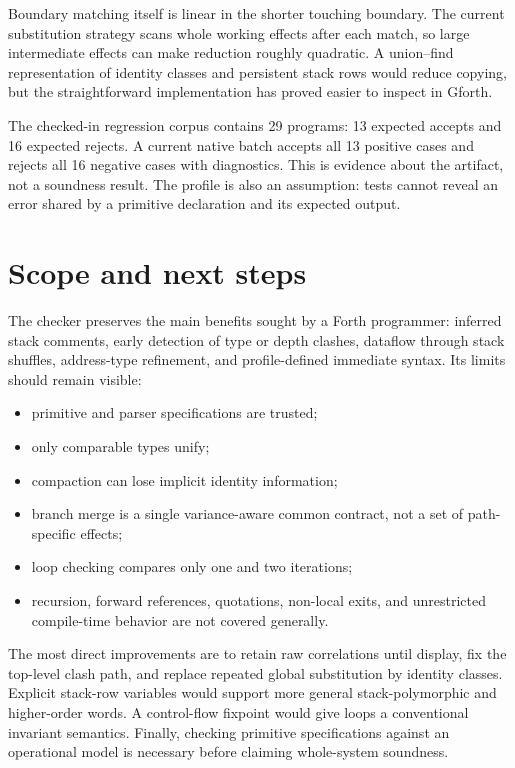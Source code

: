 \documentclass[10pt,a4paper]{article}
\begin{document}
Boundary matching itself is linear in the shorter touching boundary.  The
current substitution strategy scans whole working effects after each match,
so large intermediate effects can make reduction roughly quadratic.  A
union--find representation of identity classes and persistent stack rows would
reduce copying, but the straightforward implementation has proved easier to
inspect in Gforth.

The checked-in regression corpus contains 29 programs: 13 expected accepts and
16 expected rejects.  A current native batch accepts all 13 positive cases and
rejects all 16 negative cases with diagnostics.  This is evidence about the
artifact, not a soundness result.  The profile is also an assumption: tests
cannot reveal an error shared by a primitive declaration and its expected
output.

\section{Scope and next steps}

The checker preserves the main benefits sought by a Forth programmer: inferred
stack comments, early detection of type or depth clashes, dataflow through
stack shuffles, address-type refinement, and profile-defined immediate syntax.
Its limits should remain visible:
\begin{itemize}
  \item primitive and parser specifications are trusted;
  \item only comparable types unify;
  \item compaction can lose implicit identity information;
  \item branch merge is a single variance-aware common contract, not a set of
        path-specific effects;
  \item loop checking compares only one and two iterations;
  \item recursion, forward references, quotations, non-local exits, and
        unrestricted compile-time behavior are not covered generally.
\end{itemize}

The most direct improvements are to retain raw correlations until display, fix
the top-level clash path, and replace repeated global substitution by identity
classes.  Explicit stack-row variables would support more general
stack-polymorphic and higher-order words.  A control-flow fixpoint would give
loops a conventional invariant semantics.  Finally, checking primitive
specifications against an operational model is necessary before claiming
whole-system soundness.
\end{document}
